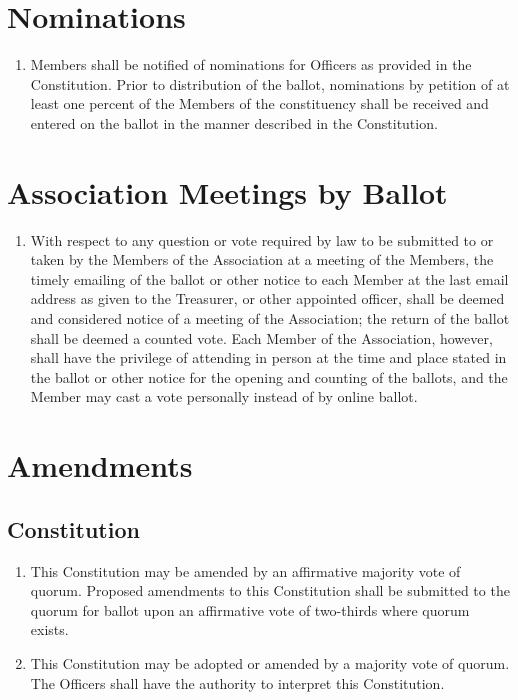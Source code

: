 \documentclass[12pt,letterpaper]{article}
\begin{document}
\section{Nominations}
\begin{enumerate}
  \item Members shall be notified of nominations for Officers as provided in the
        Constitution. Prior to distribution of the ballot, nominations by petition of at
        least one percent of the Members of the constituency shall be received and
        entered on the ballot in the manner described in the Constitution.
\end{enumerate}

\section{Association Meetings by Ballot}
\begin{enumerate}
  \item With respect to any question or vote required by law to be submitted to or
        taken by the Members of the Association at a meeting of the Members, the
        timely emailing of the ballot or other notice to each Member at the last
        email address as given to the Treasurer, or other appointed officer, shall be
        deemed and considered notice of a meeting of the Association; the return of
        the ballot shall be deemed a counted vote. Each Member of the Association,
        however, shall have the privilege of attending in person at the time and
        place stated in the ballot or other notice for the opening and counting of
        the ballots, and the Member may cast a vote personally instead of by online
        ballot.
\end{enumerate}

\section{Amendments}

\subsection{Constitution}
\begin{enumerate}
  \item This Constitution may be amended by an affirmative majority vote of quorum.
        Proposed amendments to this Constitution shall be submitted to the quorum for
        ballot upon an affirmative vote of two-thirds where quorum exists.
  \item This Constitution may be adopted or amended by a majority vote of quorum. The
        Officers shall have the authority to interpret this Constitution.
\end{enumerate}
\end{document}
